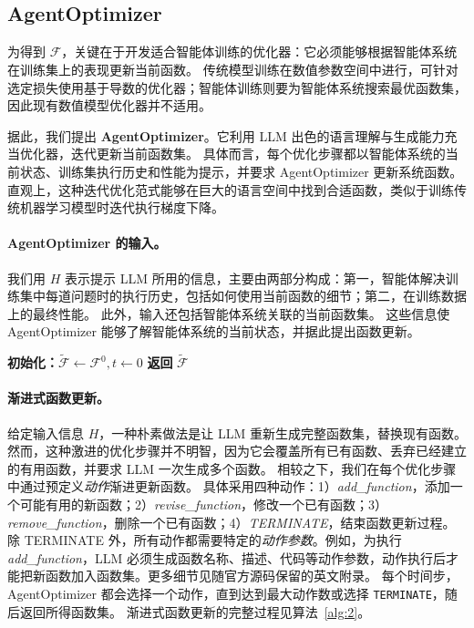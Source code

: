 \documentclass{article}
\begin{document}
\subsection{AgentOptimizer}

为得到 $\hat{\mathcal{F}}$，关键在于开发适合智能体训练的优化器：它必须能够根据智能体系统在训练集上的表现更新当前函数。
传统模型训练在数值参数空间中进行，可针对选定损失使用基于导数的优化器；智能体训练则要为智能体系统搜索最优函数集，因此现有数值模型优化器并不适用。

据此，我们提出 \textbf{AgentOptimizer}。它利用 LLM 出色的语言理解与生成能力充当优化器，迭代更新当前函数集。
具体而言，每个优化步骤都以智能体系统的当前状态、训练集执行历史和性能为提示，并要求 AgentOptimizer 更新系统函数。
直观上，这种迭代优化范式能够在巨大的语言空间中找到合适函数，类似于训练传统机器学习模型时迭代执行梯度下降。

\paragraph{AgentOptimizer 的输入。}
我们用 $H$ 表示提示 LLM 所用的信息，主要由两部分构成：第一，智能体解决训练集中每道问题时的执行历史，包括如何使用当前函数的细节；第二，在训练数据上的最终性能。
此外，输入还包括智能体系统关联的当前函数集。
这些信息使 AgentOptimizer 能够了解智能体系统的当前状态，并据此提出函数更新。

\begin{algorithm}[htb!]
\small
\captionsetup{font=small}
\SetNoFillComment
\SetAlCapNameFnt{\small}
\SetAlCapFnt{\small}
\renewcommand{\baselinestretch}{0.78}
\caption{渐进式函数更新（\texttt{AgentOptimizer.step}）}
\label{alg:2}
\textbf{初始化：}$\tilde{\mathcal{F}}\gets\mathcal{F}^{0},t\gets0$
\textbf{返回} $\tilde{\mathcal{F}}$
\end{algorithm}

\paragraph{渐进式函数更新。}
给定输入信息 $H$，一种朴素做法是让 LLM 重新生成完整函数集，替换现有函数。
然而，这种激进的优化步骤并不明智，因为它会覆盖所有已有函数、丢弃已经建立的有用函数，并要求 LLM 一次生成多个函数。
相较之下，我们在每个优化步骤中通过预定义\emph{动作}渐进更新函数。
具体采用四种动作：1）\emph{add\_function}，添加一个可能有用的新函数；2）\emph{revise\_function}，修改一个已有函数；3）\emph{remove\_function}，删除一个已有函数；4）\emph{TERMINATE}，结束函数更新过程。
除 TERMINATE 外，所有动作都需要特定的\emph{动作参数}。例如，为执行 \emph{add\_function}，LLM 必须生成函数名称、描述、代码等动作参数，动作执行后才能把新函数加入函数集。更多细节见随官方源码保留的英文附录。
每个时间步，AgentOptimizer 都会选择一个动作，直到达到最大动作数或选择 \texttt{TERMINATE}，随后返回所得函数集。
渐进式函数更新的完整过程见算法~\ref{alg:2}。
\end{document}
